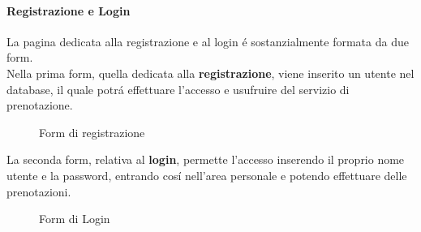\documentclass[]{article}
\begin{document}
\paragraph*{Registrazione e Login}
La pagina dedicata alla registrazione e al login é sostanzialmente formata da due form.\\
Nella prima form, quella dedicata alla \textbf{registrazione}, viene inserito un utente nel database, il quale potrá effettuare l'accesso e usufruire del servizio di prenotazione.
\begin{figure}[H]
	\centering
	\caption{Form di registrazione}
\end{figure}
La seconda form, relativa al \textbf{login}, permette l'accesso inserendo il proprio nome utente e la password, entrando cosí nell'area personale e potendo effettuare delle prenotazioni.
\begin{figure}[H]
	\centering
	\caption{Form di Login}
\end{figure}
\end{document}
